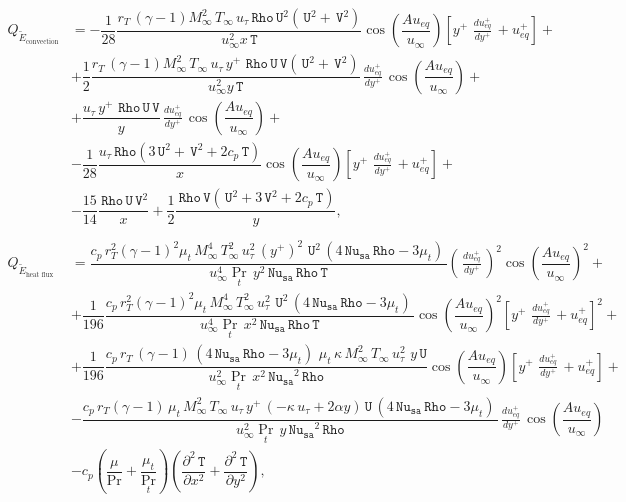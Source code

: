 \documentclass[10pt]{article}
\newcommand{\diff}[2] {\dfrac{\partial #1}{\partial #2}}
\newcommand{\Rho}{\,\mathtt{Rho}}
\newcommand{\U}{\,\mathtt{U}}
\newcommand{\V}{\,\mathtt{V}}
\newcommand{\Nu}{\,\mathtt{Nu_{sa}}}
\newcommand{\T}{\,\mathtt{T}}
\newcommand{\Dueqplusyplus}{\, \frac{du_{eq}^+}{dy^+}\,}
\newcommand{\tE}{\tilde{E}}
\begin{document}
\begin{equation*}
 \begin{split}
Q_{\tE_\text{convection}} &= -\dfrac{1}{28} \dfrac{  r_T \, (\gamma-1)  M_{\infty}^2 \, T_{\infty} \,  u_{\tau} \Rho \U^2 (\U^2+\V^2)}{u_{\infty}^2 x \T}\cos\left(\dfrac{A u_{eq}}{u_{\infty}}\right)\left[y^{+} \, \Dueqplusyplus+u_{eq}^{+} \right] +\\
  &+\dfrac{1}{2} \dfrac{ r_T \, (\gamma-1) M_{\infty}^2 \, T_{\infty} \,  u_{\tau} \, y^{+} \,  \Rho \U \V (\U^2+\V^2)}{u_{\infty}^2 y \T}\Dueqplusyplus  \cos\left(\dfrac{A u_{eq}}{u_{\infty}}\right)+\\
  &+ \dfrac{u_{\tau} \, y^{+} \, \Rho \U \V }{y}\Dueqplusyplus \cos\left(\dfrac{A u_{eq}}{u_{\infty}}\right)+\\
  &-\dfrac{1}{28} \dfrac{u_{\tau} \Rho (3 \U^2+\V^2+2 c_p  \T)}{x}   \cos\left(\dfrac{A u_{eq}}{u_{\infty}}\right)\left[y^{+} \, \Dueqplusyplus+u_{eq}^{+} \right] +\\
  &-\dfrac{15}{14} \dfrac{\Rho \U \V^2}{x}+\dfrac{1}{2}  \dfrac{ \Rho \V(\U^2+3 \V^2+2 c_p  \T)}{y},\\
%
&\\
%
Q_{\tE_\text{heat flux}} &= \dfrac{ c_p \,  r_T^2 (\gamma-1)^2\mu_t \, M_{\infty}^4 \,  T_{\infty}^2  \,   u_{\tau}^2 \, (y^{+})^2 \,  \U^2 \, (4 \Nu \Rho-3 \mu_t) \, }{u_{\infty}^4 \Pr_t \, y^2 \Nu \Rho \T}\left(\Dueqplusyplus\right)^2 \cos\left(\dfrac{A u_{eq}}{u_{\infty}}\right)^2+\\
  &+\dfrac{1}{196} \dfrac{c_p \,  r_T^2  (\gamma-1)^2  \mu_t \, M_{\infty}^4 \,  T_{\infty}^2  \,  u_{\tau}^2 \, \U^2\, (4 \Nu \Rho-3 \mu_t) \,}{u_{\infty}^4 \Pr_t \, x^2 \Nu \Rho \T}\cos\left(\dfrac{A u_{eq}}{u_{\infty}}\right)^2\left[y^{+} \, \Dueqplusyplus+u_{eq}^{+} \right]^2+\\
  &+\dfrac{1}{196}\dfrac{c_p \,  r_T \, (\gamma-1) \, (4 \Nu \Rho-3 \mu_t) \, \,  \mu_t \, \kappa \,  M_{\infty}^2 \, T_{\infty} \,  u_{\tau}^2 \, \, y \U}{u_{\infty}^2 \Pr_t \, x^2 \Nu^2 \Rho} \cos\left(\dfrac{A u_{eq}}{u_{\infty}}\right)\left[y^{+} \, \Dueqplusyplus+u_{eq}^{+} \right]  +\\
  &-\dfrac{c_p \,  r_T(\gamma-1) \,  \mu_t  \, M_{\infty}^2 \, T_{\infty} \,   u_{\tau} \, y^{+} \, (- \kappa \,  u_{\tau}+2 \alpha y) \U \, (4 \Nu \Rho-3 \mu_t) \,}{u_{\infty}^2 \Pr_t \, y \Nu^2 \Rho}\Dueqplusyplus  \cos\left(\dfrac{A u_{eq}}{u_{\infty}}\right)\\
  &-c_p \left(\dfrac{\mu}{\Pr}+\dfrac{\mu_t}{\Pr_t}\right)\left(\diff{^2 \T}{x^2}+\diff{^2 \T}{y^2}\right),\\ 
%
 \end{split}
\end{equation*}
\end{document}
